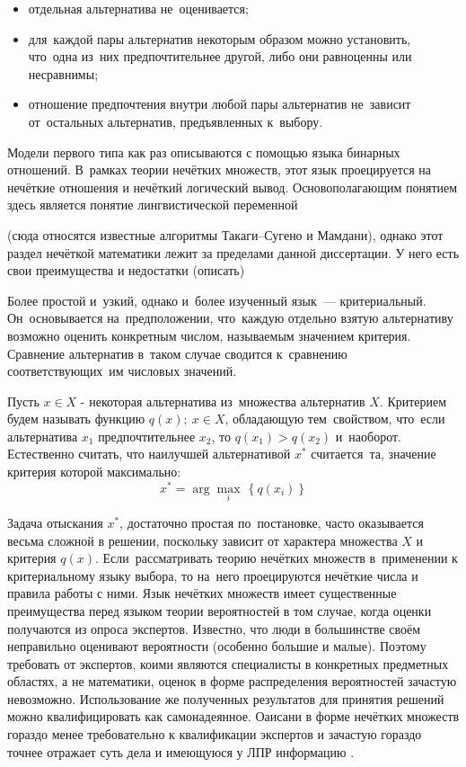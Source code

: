 \begin{itemize}
	\item отдельная альтернатива не~оценивается;
	\item для~каждой пары альтернатив некоторым образом можно установить, что~одна из~них предпочтительнее другой, либо они равноценны или несравнимы;
	\item отношение предпочтения внутри любой пары альтернатив не~зависит от~остальных альтернатив, предъявленных к~выбору.
\end{itemize}

Модели первого типа как раз описываются с помощью языка бинарных отношений. В~рамках теории нечётких множеств, этот язык проецируется на нечёткие отношения и нечёткий логический вывод. Основополагающим понятием здесь является понятие лингвистической переменной


 (сюда относятся известные алгоритмы Такаги--Сугено и Мамдани), однако этот раздел нечёткой математики лежит за пределами данной диссертации. У него есть свои преимущества и недостатки (описать)

Более простой и~узкий, однако и~более изученный язык~--- критериальный. Он~основывается на~предположении, что~каждую отдельно взятую альтернативу возможно оценить конкретным числом, называемым значением критерия. Сравнение альтернатив в~таком случае сводится к~сравнению соответствующих~им числовых значений.

Пусть $x\in X$ - некоторая альтернатива из~множества альтернатив $X$. Критерием будем называть функцию $q\left( x \right);\ x\in X$, обладающую тем~свойством, что~если альтернатива ${{x}_{1}}$ предпочтительнее ${{x}_{2}}$, то $q\left( {{x}_{1}} \right)>q\left( {{x}_{2}} \right)$ и~наоборот. Естественно считать, что наилучшей альтернативой ${{x}^{*}}$ считается~та, значение критерия которой максимально:
\[
	{{x}^{*}}=\arg \underset{i}{\mathop{\max }}\,\left\{ q\left( {{x}_{i}} \right) \right\}
\]

Задача отыскания ${{x}^{*}}$, достаточно простая по~постановке, часто оказывается весьма сложной в решении, поскольку зависит от характера множества $X$ и критерия $q\left( x \right)$. Если~рассматривать теорию нечётких множеств в~применении к критериальному языку выбора, то на~него проецируются нечёткие числа и правила работы с ними. Язык нечётких множеств имеет существенные преимущества перед языком теории вероятностей в том случае, когда оценки получаются из опроса экспертов. Известно, что люди в большинстве своём неправильно оценивают вероятности (особенно большие и малые). Поэтому требовать от экспертов, коими являются специалисты в конкретных предметных областях, а не математики, оценок в форме распределения вероятностей зачастую невозможно. Использование же полученных результатов для принятия решений можно квалифицировать как самонадеянное. Оаисани в форме нечётких множеств гораздо менее требовательно к квалификации экспертов и зачастую гораздо точнее отражает суть дела и имеющуюся у ЛПР информацию \cite{Gubko}. 




